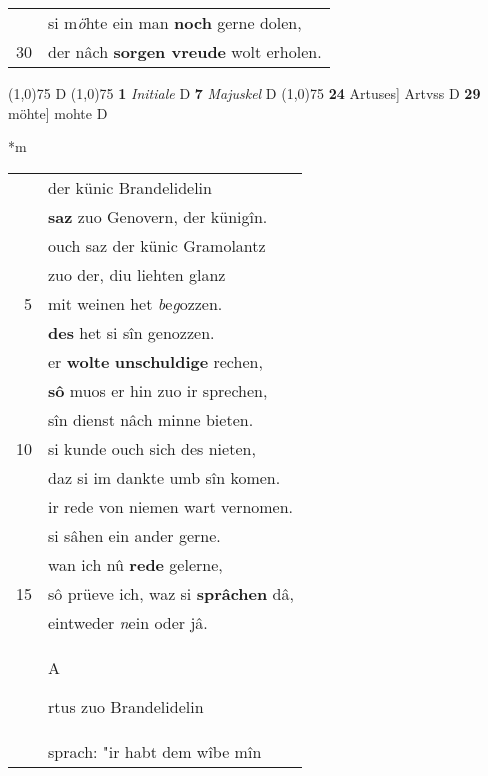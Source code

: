 \documentclass[8pt,a4paper,notitlepage]{article}
\begin{document}
\begin{table}[ht]
\begin{minipage}[t]{0.5\linewidth}
\begin{tabular}{rl}
 & si m\textit{ö}hte ein man \textbf{noch} gerne dolen,\\ 
30 & der nâch \textbf{sorgen vreude} wolt erholen.\\ 
\end{tabular}
\scriptsize
\line(1,0){75} \newline
D \newline
\line(1,0){75} \newline
\textbf{1} \textit{Initiale} D  \textbf{7} \textit{Majuskel} D  \newline
\line(1,0){75} \newline
\textbf{24} Artuses] Artvss D \textbf{29} möhte] mohte D \newline
\end{minipage}
\hspace{0.5cm}
\begin{minipage}[t]{0.5\linewidth}
\small
\begin{center}*m
\end{center}
\begin{tabular}{rl}
 & der künic Brandelidelin\\ 
 & \textbf{saz} zuo Genovern, der künigîn.\\ 
 & ouch saz der künic Gramolantz\\ 
 & zuo der, diu liehten glanz\\ 
5 & mit weinen het \textit{b}e\textit{g}ozzen.\\ 
 & \textbf{des} het si sîn genozzen.\\ 
 & er \textbf{wolte} \textbf{unschuldige} rechen,\\ 
 & \textbf{sô} muos er hin zuo ir sprechen,\\ 
 & sîn dienst nâch minne bieten.\\ 
10 & si kunde ouch sich des nieten,\\ 
 & daz si im dankte umb sîn komen.\\ 
 & ir rede von niemen wart vernomen.\\ 
 & si sâhen ein ander gerne.\\ 
 & wan ich nû \textbf{rede} gelerne,\\ 
15 & sô prüeve ich, waz si \textbf{sprâchen} dâ,\\ 
 & eintweder \textit{n}ein oder jâ.\\ 
 & \begin{large}A\end{large}rtus zuo Brandelidelin\\ 
 & sprach: "ir habt dem wîbe mîn\\ 

\end{tabular}
\end{minipage}
\end{table}
\end{document}
